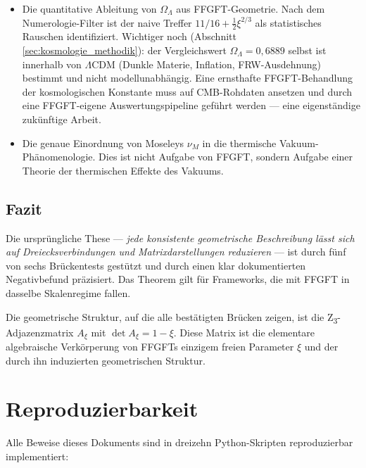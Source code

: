 \begin{itemize}
\item Die quantitative Ableitung von \(\Omega_\Lambda\) aus FFGFT-Geometrie. Nach dem Numerologie-Filter ist der naive Treffer \(11/16 + \tfrac{1}{2}\xi^{2/3}\) als statistisches Rauschen identifiziert. Wichtiger noch (Abschnitt \ref{sec:kosmologie_methodik}): der Vergleichswert \(\Omega_\Lambda = 0{,}6889\) selbst ist innerhalb von \(\Lambda\)CDM (Dunkle Materie, Inflation, FRW-Ausdehnung) bestimmt und nicht modellunabhängig. Eine ernsthafte FFGFT-Behandlung der kosmologischen Konstante muss auf CMB-Rohdaten ansetzen und durch eine FFGFT-eigene Auswertungspipeline geführt werden — eine eigenständige zukünftige Arbeit.
\item Die genaue Einordnung von Moseleys \(\nu_M\) in die thermische Vakuum-Phänomenologie. Dies ist nicht Aufgabe von FFGFT, sondern Aufgabe einer Theorie der thermischen Effekte des Vakuums.
\end{itemize}

\subsection{Fazit}

\begin{conclusionBox}
Die ursprüngliche These — \emph{jede konsistente geometrische Beschreibung lässt sich auf Dreiecksverbindungen und Matrixdarstellungen reduzieren} — ist durch fünf von sechs Brückentests gestützt und durch einen klar dokumentierten Negativbefund präzisiert. Das Theorem gilt für Frameworks, die mit FFGFT in dasselbe Skalenregime fallen.

Die geometrische Struktur, auf die alle bestätigten Brücken zeigen, ist die Z\textsubscript{3}-Adjazenzmatrix \(A_\xi\) mit \(\det A_\xi = 1 - \xi\). Diese Matrix ist die elementare algebraische Verkörperung von FFGFTs einzigem freien Parameter \(\xi\) und der durch ihn induzierten geometrischen Struktur.
\end{conclusionBox}

\section*{Reproduzierbarkeit}

Alle Beweise dieses Dokuments sind in dreizehn Python-Skripten reproduzierbar implementiert:

